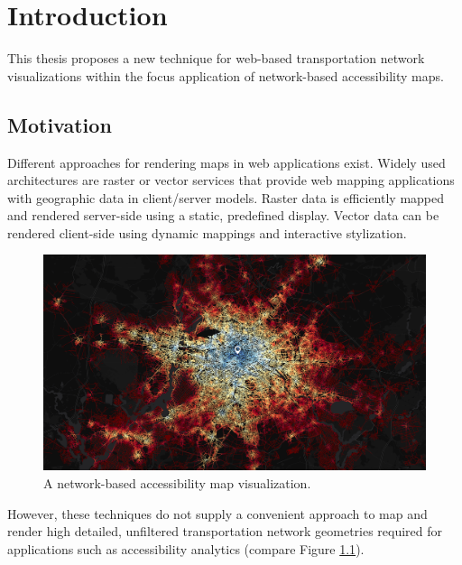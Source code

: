 
\cleardoublepage
\chapter{Introduction}
  \label{chap:intro}
  This thesis proposes a new technique for web-based transportation network
  visualizations within the focus application of network-based accessibility
  maps.\par

  \section{Motivation}
    \label{sec:intro:motiv}
    Different approaches for rendering maps in web applications exist.
    Widely used architectures are raster or vector services that provide web
    mapping applications with geographic data in client/server models.
    Raster data is efficiently mapped and rendered server-side using a
    static, predefined display. Vector data can be rendered client-side
    using dynamic mappings and interactive stylization.\par

    \begin{figure}[htb]
      \centering
      \includegraphics[width=\linewidth]
        {./img/screenshot-teaser-7200s-publictransport.png}
      \caption{A network-based accessibility map visualization.}
      \label{fig:intro:teasr}
    \end{figure}

    However, these techniques do not supply a convenient approach to map and
    render high detailed, unfiltered transportation network geometries
    required for applications such as accessibility analytics (compare Figure
    \ref{fig:intro:teasr}).\par

